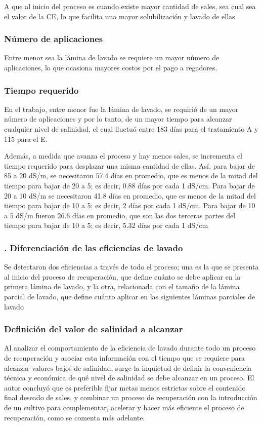 A que al inicio del proceso es cuando existe mayor cantidad de sales, sea cual sea el valor de la CE, lo que facilita una mayor solubilización y lavado de ellas

\subsubsection{Número de aplicaciones}
Entre menor sea la lámina de lavado se requiere un mayor número de aplicaciones, lo que ocasiona mayores costos por el pago a regadores.
\subsubsection{Tiempo requerido}
En el trabajo, entre menor fue la lámina de lavado, se requirió de un mayor número de aplicaciones y por lo tanto, de un mayor tiempo para alcanzar cualquier nivel de salinidad, el cual fluctuó entre 183 días para el tratamiento A y 115 para el E.

Además, a medida que avanza el proceso y hay menos sales, se incrementa el tiempo requerido para desplazar una misma cantidad de ellas. Así, para bajar de 85 a 20 dS/m, se necesitaron 57.4 días en promedio, que es menos de la mitad del tiempo para bajar de 20 a 5; es decir, 0.88 días por cada 1 dS/cm. Para bajar de 20 a 10 dS/m se necesitaron 41.8 días en promedio, que es menos de la mitad del tiempo para bajar de 10 a 5; es decir, 2 días por cada 1 dS/cm. Para bajar de 10 a 5 dS/m fueron 26.6 días en promedio, que son las dos terceras partes del tiempo para bajar de 10 a 5; es decir, 5.32 días por cada 1 dS/cm

\subsubsection{. Diferenciación de las eficiencias de lavado}
Se detectaron dos eficiencias a través de todo el proceso; una es la que se presenta al inicio del proceso de recuperación, que define cuánto se debe aplicar en la primera lámina de lavado, y la otra, relacionada con el tamaño de la lámina parcial de lavado, que define cuánto aplicar en las siguientes láminas parciales de lavado

\subsubsection{Definición del valor de salinidad a alcanzar}
Al analizar el comportamiento de la eficiencia de lavado durante todo un proceso de recuperación y asociar esta información con el tiempo que se requiere para alcanzar valores bajos de salinidad, surge la inquietud de definir la conveniencia técnica y económica de qué nivel de salinidad se debe alcanzar en un proceso. El autor concluyó que es preferible fijar metas menos estrictas sobre el contenido final deseado de sales, y combinar un proceso de recuperación con la introducción de un cultivo para complementar, acelerar y hacer más eficiente el proceso de recuperación, como se comenta más adelante.

